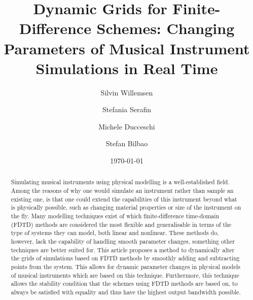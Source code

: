 \documentclass[dvipsnames, preprint]{JASA}
\begin{document}
\title[JASA/Dynamic Grids for Finite-Difference Schemes]{Dynamic Grids for Finite-Difference Schemes: Changing Parameters of Musical Instrument Simulations in Real Time}
\author{Silvin Willemsen}
\author{Stefania Serafin}

\author{Michele Ducceschi}
\author{Stefan Bilbao}
 



\date{\today} 

\begin{abstract}
Simulating musical instruments using physical modelling is a well-established field. Among the reasons of why one would simulate an instrument rather than sample an existing one, is that one could extend the capabilities of this instrument beyond what is physically possible, such as changing material properties or size of the instrument on the fly. Many modelling techniques exist of which finite-difference time-domain (FDTD) methods are considered the most flexible and generalisable in terms of the type of systems they can model, both linear and nonlinear. These methods do, however, lack the capability of handling smooth parameter changes, something other techniques are better suited for. This article proposes a method to dynamically alter the grids of simulations based on FDTD methods by smoothly adding and subtracting points from the system. This allows for dynamic parameter changes in physical models of musical instruments which are based on this technique. Furthermore, this technique allows the stability condition that the schemes using FDTD methods are based on, to always be satisfied with equality and thus have the highest output bandwidth possible. 
\end{abstract}


\maketitle

\end{document}
